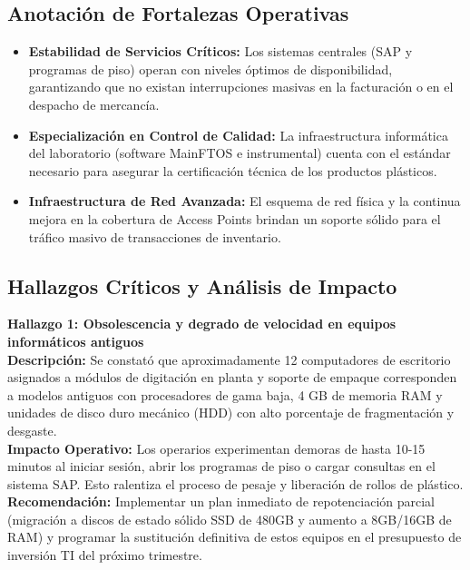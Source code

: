 		\subsection{Anotación de Fortalezas Operativas}
		\begin{itemize}
			\item \textbf{Estabilidad de Servicios Críticos:} Los sistemas centrales (SAP y programas de piso) operan con niveles óptimos de disponibilidad, garantizando que no existan interrupciones masivas en la facturación o en el despacho de mercancía.
			\item \textbf{Especialización en Control de Calidad:} La infraestructura informática del laboratorio (software MainFTOS e instrumental) cuenta con el estándar necesario para asegurar la certificación técnica de los productos plásticos.
			\item \textbf{Infraestructura de Red Avanzada:} El esquema de red física y la continua mejora en la cobertura de Access Points brindan un soporte sólido para el tráfico masivo de transacciones de inventario.
		\end{itemize}
		
		\subsection{Hallazgos Críticos y Análisis de Impacto}
		
		\noindent\textbf{Hallazgo 1: Obsolescencia y degrado de velocidad en equipos informáticos antiguos}\\
		\textbf{Descripción:} Se constató que aproximadamente 12 computadores de escritorio asignados a módulos de digitación en planta y soporte de empaque corresponden a modelos antiguos con procesadores de gama baja, 4 GB de memoria RAM y unidades de disco duro mecánico (HDD) con alto porcentaje de fragmentación y desgaste.\\
		\textbf{Impacto Operativo:} Los operarios experimentan demoras de hasta 10-15 minutos al iniciar sesión, abrir los programas de piso o cargar consultas en el sistema SAP. Esto ralentiza el proceso de pesaje y liberación de rollos de plástico.\\
		\textbf{Recomendación:} Implementar un plan inmediato de repotenciación parcial (migración a discos de estado sólido SSD de 480GB y aumento a 8GB/16GB de RAM) y programar la sustitución definitiva de estos equipos en el presupuesto de inversión TI del próximo trimestre.
		
